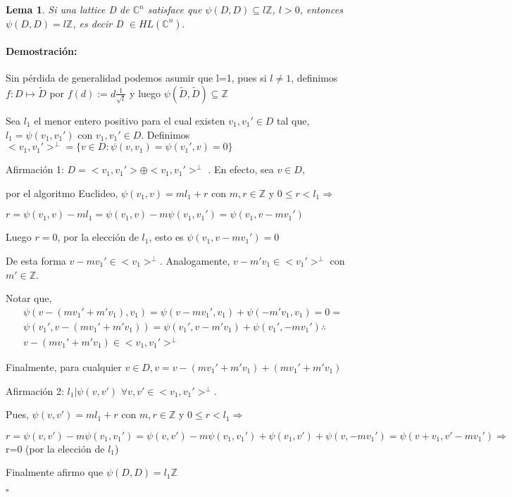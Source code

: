 \documentclass[12pt]{article}
\newtheorem{lemma}{Lema}
\newenvironment{proof}{\paragraph{Demostración:}}{\hfill$\square$}
\begin{document}
\begin{lemma} \label{1.7}
 Si una lattice D de $\mathbb{C}^n$  satisface que $\psi(D,D) \subseteq  l \mathbb{Z}$, $l>0$, entonces 
 $\psi (D,D)=l\mathbb{Z}$, es decir D $\in HL(\mathbb{C}^{n}).$
\end{lemma}
\begin{proof}
 Sin pérdida de generalidad podemos asumir que l=1, pues si $l\neq1$, definimos  
 $f:D\mapsto \tilde{D}$ por $f(d):=d\frac{1}{\sqrt{l}}$
y luego $\psi (\tilde{D},\tilde{D})\subseteq \mathbb{Z}$
 
Sea $l_1$ el menor entero positivo para el cual existen $
v_1,v_1' \in D$ tal que, $l_1=\psi (v_1,v_1')$ con 
$v_1,v_1' \in D$.
 Definimos $<v_1,v_1'>^\bot=\{v \in D: \psi(v,v_1)=\psi(v_1',v)=0\}$
 \newline
 
 Afirmación 1: $D=<v_1,v_1'>\oplus <v_1,v_1'>^\bot$ . En efecto, sea $v \in D$,
 
 por el algoritmo Euclideo, $\psi(v_1,v)=m l_1 +r$ con $m,r \in \mathbb{Z}$ y $0 \leq r < l_1 \Rightarrow $
 
 $r=\psi(v_1,v)-m l_1=\psi(v_1,v)-m \psi(v_1,v_1')=\psi(v_1,v-mv_1')$
 
 
Luego $r=0$, por la elección de $l_1$, esto es $\psi(v_1,v-mv_1')=0$
 
 De esta forma $v-mv_1' \in <v_1>^\bot$.
 Analogamente, $v-m'v_1 \in <v_1'>^\bot$  con $m'\in \mathbb{Z}$.
 
 Notar que,
 $$\begin{aligned}
 \psi(v-(m v_1' + m' v_1),v_1)=\psi(v-m v_1',v_1) + \psi(-m' v_1,v_1)=0=\\
 \psi(v_1',v-(m v_1'+m'v_1))=\psi(v_1',v-m'v_1)+ \psi(v_1',-m v_1') \therefore \\
 v-(m v_1'+m'v_1) \in <v_1,v_1'>^\bot
 \end{aligned}$$
 
 Finalmente, para cualquier $v\in D, v=v-(m v_1'+ m'v_1)+(m v_1' + m'v_1)$ 
 \newline
  
 
 Afirmación 2: $l_1 | \psi(v,v')$ $\forall v,v' \in <v_1,v_1'>^\bot$.
 
 Pues, $\psi(v,v')=m l_1 + r$ con $m,r \in \mathbb{Z}$ y  $0\leq r < l_1 \Rightarrow $
 
 $r= \psi(v,v') - m \psi(v_1,v_1')=\psi(v,v')-m\psi(v_1,v_1')+ \psi (v_1,v')+ \psi(v,-m v_1') 
 = \psi(v+v_1,v'-mv_1') \Rightarrow $ r=0 (por la elección de $l_1$) 
 
 Finalmente afirmo que $\psi(D,D)=l_1 \mathbb{Z}$ 
 

\end{proof}
\end{document}
